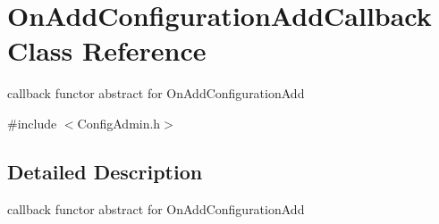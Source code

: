 \section{OnAddConfigurationAddCallback Class Reference}
\label{classOnAddConfigurationAddCallback}


callback functor abstract for OnAddConfigurationAdd  




{\ttfamily \#include $<$ConfigAdmin.h$>$}



\subsection{Detailed Description}
callback functor abstract for OnAddConfigurationAdd 